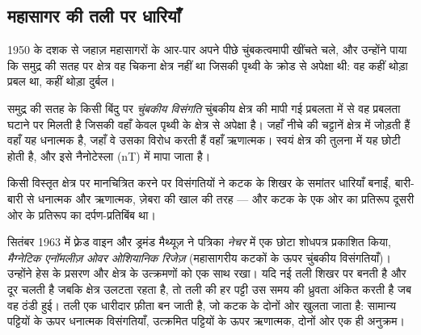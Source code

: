 \subsection{महासागर की तली पर धारियाँ}

1950 के दशक से जहाज़ महासागरों के आर-पार अपने पीछे चुंबकत्वमापी खींचते चले, और
उन्होंने पाया कि समुद्र की सतह पर क्षेत्र वह चिकना क्षेत्र नहीं था जिसकी
पृथ्वी के क्रोड से अपेक्षा थी: वह कहीं थोड़ा प्रबल था, कहीं थोड़ा दुर्बल।

\begin{definition}[चुंबकीय विसंगति]\label{def:g11:drift-to-spreading:anomaly}
समुद्र की सतह के किसी बिंदु पर
\emph{चुंबकीय विसंगति} चुंबकीय क्षेत्र की मापी गई प्रबलता में से वह प्रबलता घटाने पर मिलती है
जिसकी वहाँ केवल पृथ्वी के क्षेत्र से अपेक्षा है। जहाँ नीचे की चट्टानें
क्षेत्र में जोड़ती हैं वहाँ यह धनात्मक है, जहाँ वे उसका विरोध करती हैं वहाँ ऋणात्मक। स्वयं
क्षेत्र की तुलना में यह छोटी होती है, और इसे नैनोटेस्ला (\unit{nT}) में मापा जाता है।
\end{definition}

किसी विस्तृत क्षेत्र पर मानचित्रित करने पर विसंगतियों ने कटक के शिखर के समांतर धारियाँ बनाईं,
बारी-बारी से धनात्मक और ऋणात्मक, ज़ेबरा की खाल की तरह --- और कटक के एक ओर का
प्रतिरूप दूसरी ओर के प्रतिरूप का दर्पण-प्रतिबिंब था।

\begin{history}[वाइन और मैथ्यूज़, 1963]
सितंबर 1963 में फ़्रेड वाइन और ड्रमंड मैथ्यूज़ ने पत्रिका \emph{नेचर} में एक छोटा शोधपत्र प्रकाशित किया,
\emph{मैग्नेटिक एनॉमलीज़ ओवर ओशियानिक रिजेज़} (महासागरीय कटकों के ऊपर चुंबकीय विसंगतियाँ)। उन्होंने हेस के प्रसरण और
क्षेत्र के उत्क्रमणों को एक साथ रखा। यदि नई तली शिखर पर बनती है और
दूर चलती है जबकि क्षेत्र उलटता रहता है, तो तली की हर पट्टी उस
समय की ध्रुवता अंकित करती है जब वह ठंडी हुई। तली एक धारीदार फ़ीता बन जाती है, जो कटक के
दोनों ओर खुलता जाता है: सामान्य पट्टियों के ऊपर धनात्मक विसंगतियाँ, उत्क्रमित पट्टियों के ऊपर
ऋणात्मक, दोनों ओर एक ही अनुक्रम।
\end{history}

